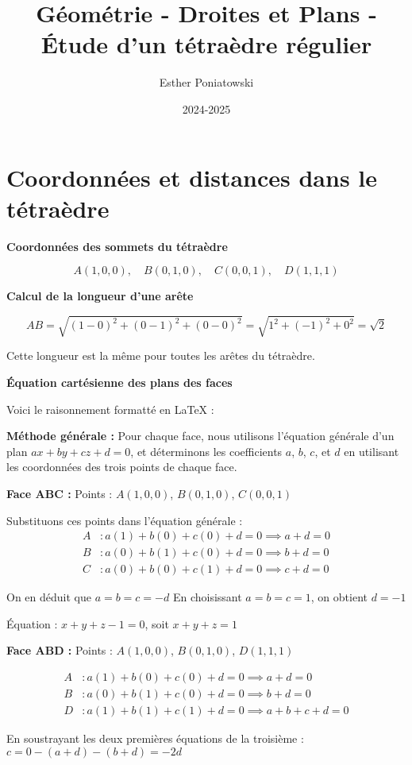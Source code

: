 \documentclass[10pt,a4paper]{article}
\title{Géométrie - Droites et Plans - Étude d'un tétraèdre régulier}
\author{Esther Poniatowski}
\date{2024-2025}
\begin{document}
\section{Coordonnées et distances dans le tétraèdre}

\q \textbf{Coordonnées des sommets du tétraèdre}

\[
A(1,0,0), \quad B(0,1,0), \quad C(0,0,1),  \quad D(1,1,1)
\]


\q \textbf{Calcul de la longueur d'une arête}

$$
AB = \sqrt{(1-0)^2 + (0-1)^2 + (0-0)^2} = \sqrt{1^2 + (-1)^2 + 0^2} = \sqrt{2}
$$

Cette longueur est la même pour toutes les arêtes du tétraèdre.


\q \textbf{Équation cartésienne des plans des faces}

Voici le raisonnement formatté en LaTeX :

\textbf{Méthode générale :}
Pour chaque face, nous utilisons l'équation générale d'un plan $ax + by + cz + d = 0$, et déterminons les coefficients $a$, $b$, $c$, et $d$ en utilisant les coordonnées des trois points de chaque face.

\textbf{Face ABC :}
Points : $A(1,0,0)$, $B(0,1,0)$, $C(0,0,1)$

Substituons ces points dans l'équation générale :
\begin{align*}
A &: a(1) + b(0) + c(0) + d = 0 \implies a + d = 0 \\
B &: a(0) + b(1) + c(0) + d = 0 \implies b + d = 0 \\
C &: a(0) + b(0) + c(1) + d = 0 \implies c + d = 0
\end{align*}

On en déduit que $a = b = c = -d$
En choisissant $a = b = c = 1$, on obtient $d = -1$

Équation : $x + y + z - 1 = 0$, soit $x + y + z = 1$

\textbf{Face ABD :}
Points : $A(1,0,0)$, $B(0,1,0)$, $D(1,1,1)$

\begin{align*}
A &: a(1) + b(0) + c(0) + d = 0 \implies a + d = 0 \\
B &: a(0) + b(1) + c(0) + d = 0 \implies b + d = 0 \\
D &: a(1) + b(1) + c(1) + d = 0 \implies a + b + c + d = 0
\end{align*}

En soustrayant les deux premières équations de la troisième :
$c = 0 - (a + d) - (b + d) = -2d$
\end{document}
